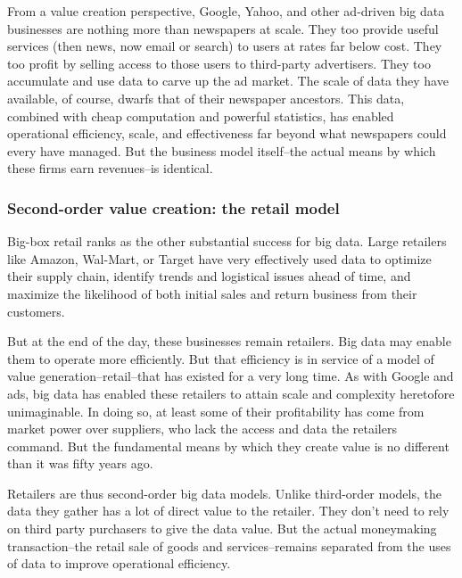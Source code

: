 \documentclass[12pt]{article}
\begin{document}
From a value creation perspective, Google, Yahoo, and other ad-driven
big data businesses are nothing more than newspapers at scale. They
too provide useful services (then news, now email or search) to users
at rates far below cost. They too profit by selling access to those
users to third-party advertisers. They too accumulate and use data to
carve up the ad market. The scale of data they have available, of
course, dwarfs that of their newspaper ancestors. This data, combined
with cheap computation and powerful statistics, has enabled
operational efficiency, scale, and effectiveness far beyond what
newspapers could every have managed. But the business model
itself--the actual means by which these firms earn revenues--is
identical.

\subsubsection{Second-order value creation: the retail model}
\label{sec:second-order-value}


Big-box retail ranks as the other substantial success for big
data. Large retailers like Amazon, Wal-Mart, or Target have very
effectively used data to optimize their supply chain, identify trends
and logistical issues ahead of time, and maximize the likelihood of
both initial sales and return business from their customers. 

But at the end of the day, these businesses remain retailers. Big data
may enable them to operate more efficiently. But that efficiency is in
service of a model of value generation--retail--that has existed for a
very long time. As with Google and ads, big data has enabled these
retailers to attain scale and complexity heretofore unimaginable. In
doing so, at least some of their profitability has come from market
power over suppliers, who lack the access and data the retailers
command. But the fundamental means by which they create value is no
different than it was fifty years ago.

Retailers are thus second-order big data models. Unlike third-order
models, the data they gather has a lot of direct value to the
retailer. They don't need to rely on third party purchasers to give
the data value. But the actual moneymaking transaction--the retail
sale of goods and services--remains separated from the uses of data to
improve operational efficiency. 

\end{document}

